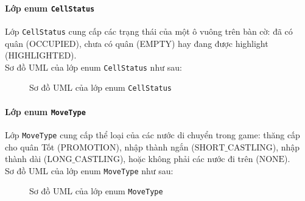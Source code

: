 \paragraph{Lớp enum \lstinline{CellStatus}}
Lớp \lstinline{CellStatus} cung cấp các trạng thái của một ô vuông trên bàn cờ: đã có quân (OCCUPIED), chưa có quân (EMPTY) hay đang được highlight (HIGHLIGHTED).\\
Sơ đồ UML của lớp enum \lstinline{CellStatus} như sau:
\begin{figure}[H]
\caption{Sơ đồ UML của lớp enum \lstinline{CellStatus}}
\end{figure}

\paragraph{Lớp enum \lstinline{MoveType}}
Lớp \lstinline{MoveType} cung cấp thể loại của các nước di chuyển trong game: thăng cấp cho quân Tốt ($\mathrm{PROMOTION}$), nhập thành ngắn ($\mathrm{SHORT\_CASTLING}$), nhập thành dài ($\mathrm{LONG\_CASTLING}$), hoặc không phải các nước đi trên ($\mathrm{NONE}$).\\
Sơ đồ UML của lớp enum \lstinline{MoveType} như sau:
\begin{figure}[H]
\caption{Sơ đồ UML của lớp enum \lstinline{MoveType}}
\end{figure}


